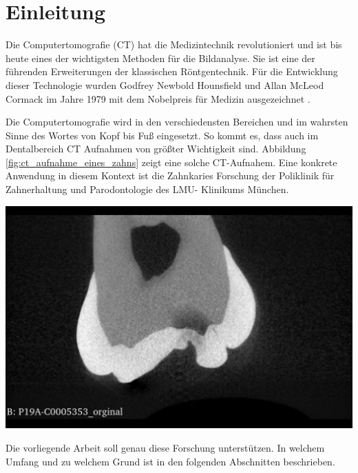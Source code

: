 \chapter{Einleitung}
\label{chap:einleitung} Die Computertomografie (CT) hat die Medizintechnik revolutioniert
und ist bis heute eines der wichtigsten Methoden für die Bildanalyse. Sie ist
eine der führenden Erweiterungen der klassischen Röntgentechnik. Für die Entwicklung
dieser Technologie wurden Godfrey Newbold Hounsfield und Allan McLeod Cormack im
Jahre 1979 mit dem Nobelpreis für Medizin ausgezeichnet \citep[Seite12]{handels2000}.

\begin{minipage}{0.40\textwidth}
	Die Computertomografie wird in den verschiedensten Bereichen und im wahrsten Sinne
	des Wortes von Kopf bis Fuß eingesetzt. So kommt es, dass auch im Dentalbereich
	CT Aufnahmen von größter Wichtigkeit sind. Abbildung
	\ref{fig:ct_aufnahme_eines_zahns} zeigt eine solche CT-Aufnahem. Eine konkrete
	Anwendung in diesem Kontext ist die Zahnkaries Forschung der Poliklinik für Zahnerhaltung
	und Parodontologie des LMU- Klinikums München.
\end{minipage}
\hfill
\begin{minipage}{0.50\textwidth}
	\centering
	\includegraphics[scale=0.2, width=\textwidth]{img/micro_ct_orginal.jpg}
	 \label{fig:ct_aufnahme_eines_zahns}
\end{minipage}

Die vorliegende Arbeit soll genau diese Forschung unterstützen. In welchem Umfang
und zu welchem Grund ist in den folgenden Abschnitten beschrieben.


